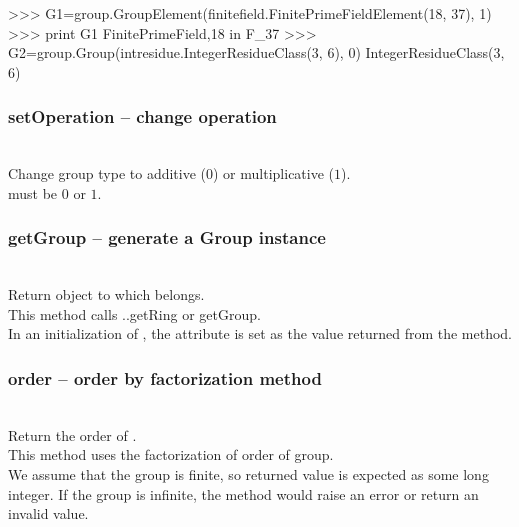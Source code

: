 \begin{ex}
>>> G1=group.GroupElement(finitefield.FinitePrimeFieldElement(18, 37), 1)
>>> print G1
FinitePrimeField,18 in F_37
>>> G2=group.Group(intresidue.IntegerResidueClass(3, 6), 0)
IntegerResidueClass(3, 6)
\end{ex}%
  \method
  \subsubsection{setOperation -- change operation}
   \\
   \spacing
   \quad Change group type to additive ($0$) or multiplicative ($1$).\\
   \spacing
   \quad {} must be $0$ or $1$.\\
 \subsubsection{\negok getGroup -- generate a Group instance}
   \\
   \spacing
   \quad Return  object to which  belongs.\\
   \spacing
   \quad \negok This method calls ..getRing or getGroup.\\
   \negok In an initialization of , the attribute  is set as the value returned from the method.\\
   \spacing
  \subsubsection{order -- order by factorization method}
   \\
   \spacing
   \quad Return the order of .\\
   \spacing
   \quad \negok This method uses the factorization of order of group.\\
   \negok We assume that the group is finite, so returned value is expected as some long integer.
   \negok If the group is infinite, the method would raise an error or return an invalid value.\\
   \spacing
